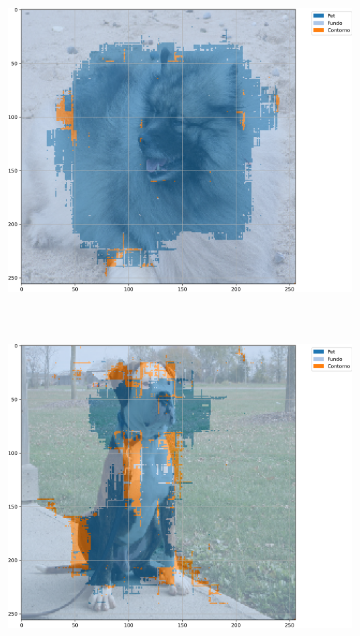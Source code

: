 \begin{figure}[H]
    \centering
    \caption{Exemplos segmentados a partir de U-Net-\textit{Like} com BPCAPooling e 20 épocas no conjunto de dados \textit{Oxford-IIIT Pets} baseada em mIoU.}
    \label{results:fig:semantic:14}
     \begin{subfigure}[t]{0.32\textwidth}
         \centering
         \includegraphics[width=1\linewidth]{recursos/imagens/results/bpca_miou_unetlie500_image_0_overlayed_segmentation.png}
         \label{results:fig:semantic:14.1}
     \end{subfigure}%
     ~ 
     \begin{subfigure}[t]{0.32\textwidth}
         \centering
         \includegraphics[width=1\linewidth]{recursos/imagens/results/bpca_miou_unetlie500_image_1_overlayed_segmentation.png}

\end{subfigure}
\end{figure}
